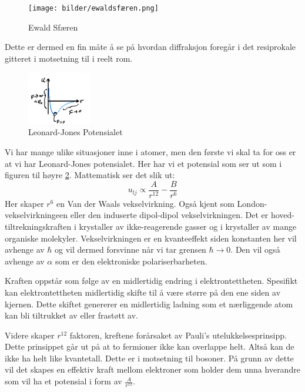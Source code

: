 \documentclass{article}
\begin{document}
\begin{figure}[H]
    \centering
    \texttt{[image: bilder/ewaldsfæren.png]}
    \caption{Ewald Sfæren}
    \label{fig:ewaldsfæren}
\end{figure}
Dette er dermed en fin måte å se på hvordan diffraksjon foregår i det resiprokale gitteret i motsetning til i reelt rom.
\nyside
{}
\begin{figure}
    \centering
    \includegraphics[width=0.25\textwidth]{bilder/leonard_jones_potensialet.png}
    \caption{Leonard-Jones Potensialet}
    \label{fig:leonard_jones_potensialet}
\end{figure}
Vi har mange ulike situasjoner inne i atomer, men den første vi skal ta for oss er at vi har Leonard-Jones potensialet. Her har vi et potensial som ser ut som i figuren til høyre \ref{fig:leonard_jones_potensialet}. Mattematisk ser det slik ut:
\begin{equation}
    \label{eq:leonard_jones_potensialet}
    u_{lj} \propto \frac{A}{r^{12}} - \frac{B}{r^6}
\end{equation}
Her skaper $r^6$ en Van der Waals vekselvirkning. Også kjent som London-vekselvirkningeen eller den induserte dipol-dipol vekselvirkningen. Det er hoved-tiltrekningskraften i krystaller av ikke-reagerende gasser og i krystaller av mange organiske molekyler. Vekselvirkningen er en kvanteeffekt siden konstanten her vil avhenge av $\hbar$ og vil dermed forsvinne når vi tar grensen $\hbar \rightarrow 0$. Den vil også avhenge av $\alpha$ som er den elektroniske polariserbarheten.

Kraften oppstår som følge av en midlertidig endring i elektrontettheten. Spesifikt kan elektrontettheten midlertidig skifte til å være større på den ene siden av kjernen. Dette skiftet genererer en midlertidig ladning som et nærliggende atom kan bli tiltrukket av eller frastøtt av.

Videre skaper $r^{12}$ faktoren, kreftene forårsaket av Pauli's utelukkelsesprinsipp. Dette prinsippet går ut på at to fermioner ikke kan overlappe helt. Altså kan de ikke ha helt like kvantetall. Dette er i motsetning til bosoner. På grunn av dette vil det skapes en effektiv kraft mellom elektroner som holder dem unna hverandre som vil ha et potensial i form av $\frac{A}{r^{12}}$.
\end{document}
